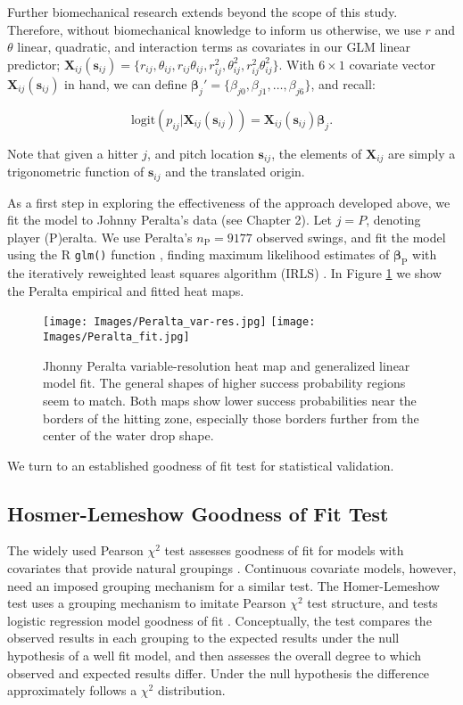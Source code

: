 Further biomechanical research extends beyond the scope of this study. Therefore, without biomechanical knowledge to inform us otherwise, we use $r$ and $\theta$ linear, quadratic, and interaction terms as covariates in our GLM linear predictor; $\pmb{X}_{ij}(\pmb{s}_{ij}) = \{r_{ij}, \theta_{ij}, r_{ij}\theta_{ij}, r_{ij}^{2}, \theta_{ij}^{2}, r_{ij}^{2}\theta_{ij}^{2}\}$. With $6 \times 1$ covariate vector $\pmb{X}_{ij}(\pmb{s}_{ij})$ in hand, we can define $\pmb{\beta}_{j}' =  \{\beta_{j0}, \beta_{j1}, \dots, \beta_{j6}\}$, and recall:

\begin{equation} \label{eq:glm}
\text{logit}(p_{ij}|\pmb{X}_{ij}(\pmb{s}_{ij})) = \pmb{X}_{ij}(\pmb{s}_{ij}) \pmb{\beta}_{j}.
\end{equation}

Note that given a hitter $j$, and pitch location $\pmb{s}_{ij}$, the elements of $\pmb{X}_{ij}$ are simply a trigonometric function of $\pmb{s}_{ij}$ and the translated origin.

As a first step in exploring the effectiveness of the approach developed above, we fit the model to Johnny Peralta's data (see Chapter 2). Let $j = P$, denoting player (P)eralta. We use Peralta's $n_{\text{P}} = 9177$ observed swings, and fit the model using the R \verb|glm()| function , finding maximum likelihood estimates of $\pmb{\beta}_{\text{P}}$ with the iteratively reweighted least squares algorithm (IRLS) \citep{Myers2012}. In Figure \ref{fig:empvsfit} we show the Peralta empirical and fitted heat maps.
  \begin{figure}[!ht]
    \centering
    \texttt{[image: Images/Peralta\_var-res.jpg]}
    \texttt{[image: Images/Peralta\_fit.jpg]}
    \caption{Jhonny Peralta variable-resolution heat map and generalized linear model fit. The general shapes of higher success probability regions seem to match. Both maps show lower success probabilities near the borders of the hitting zone, especially those borders further from the center of the water drop shape.}
    \label{fig:empvsfit}
  \end{figure}
We turn to an established goodness of fit test for statistical validation.

\subsection{Hosmer-Lemeshow Goodness of Fit Test} %

The widely used Pearson $\chi^{2}$ test assesses goodness of fit for models with covariates that provide natural groupings \citep{Pagano2000}. Continuous covariate models, however, need an imposed grouping mechanism for a similar test. The Homer-Lemeshow test uses a grouping mechanism to imitate Pearson $\chi^{2}$ test structure, and tests logistic regression model goodness of fit \citep{Hosmer2013}. Conceptually, the test compares the observed results in each grouping to the expected results under the null hypothesis of a well fit model, and then assesses the overall degree to which observed and expected results differ. Under the null hypothesis the difference approximately follows a $\chi^{2}$ distribution. 

